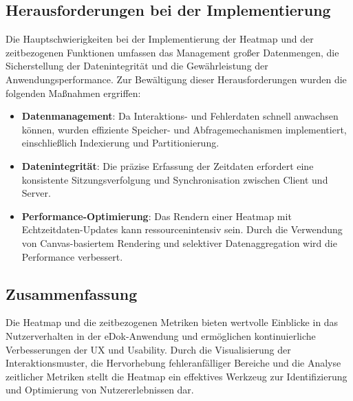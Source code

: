 \documentclass[12pt,oneside]{article}
\begin{document}
\subsection{Herausforderungen bei der Implementierung}
Die Hauptschwierigkeiten bei der Implementierung der Heatmap und der zeitbezogenen Funktionen umfassen das Management großer Datenmengen, die Sicherstellung der Datenintegrität und die Gewährleistung der Anwendungsperformance. Zur Bewältigung dieser Herausforderungen wurden die folgenden Maßnahmen ergriffen:
\begin{itemize}
    \item \textbf{Datenmanagement}: Da Interaktions- und Fehlerdaten schnell anwachsen können, wurden effiziente Speicher- und Abfragemechanismen implementiert, einschließlich Indexierung und Partitionierung.
    \item \textbf{Datenintegrität}: Die präzise Erfassung der Zeitdaten erfordert eine konsistente Sitzungsverfolgung und Synchronisation zwischen Client und Server.
    \item \textbf{Performance-Optimierung}: Das Rendern einer Heatmap mit Echtzeitdaten-Updates kann ressourcenintensiv sein. Durch die Verwendung von Canvas-basiertem Rendering und selektiver Datenaggregation wird die Performance verbessert.
\end{itemize}

\subsection{Zusammenfassung}
Die Heatmap und die zeitbezogenen Metriken bieten wertvolle Einblicke in das Nutzerverhalten in der eDok-Anwendung und ermöglichen kontinuierliche Verbesserungen der UX und Usability. Durch die Visualisierung der Interaktionsmuster, die Hervorhebung fehleranfälliger Bereiche und die Analyse zeitlicher Metriken stellt die Heatmap ein effektives Werkzeug zur Identifizierung und Optimierung von Nutzererlebnissen dar.

 

\printbibliography
 
\end{document}
